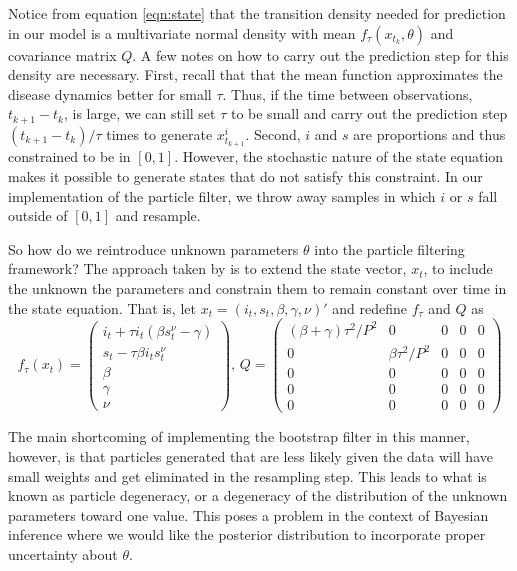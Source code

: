 \documentclass{article}
\begin{document}
Notice from equation \eqref{eqn:state} that the transition density needed for prediction in our model is a multivariate normal density with mean $f_\tau(x_{t_k},\theta)$ and covariance matrix $Q$.  A few notes on how to carry out the prediction step for this density are necessary. First, recall that that the mean function approximates the disease dynamics better for small $\tau$.  Thus, if the time between observations, $t_{k+1} - t_k$, is large, we can still set $\tau$ to be small and carry out the prediction step $(t_{k+1} - t_k) / \tau$ times to generate $x_{t_{k+1}}^i$.  Second, $i$ and $s$ are proportions and thus constrained to be in $[0,1]$.  However, the stochastic nature of the state equation makes it possible to generate states that do not satisfy this constraint.  In our implementation of the particle filter, we throw away samples in which $i$ or $s$ fall outside of $[0,1]$ and resample.

So how do we reintroduce unknown parameters $\theta$ into the particle filtering framework?  The approach taken by \citet{skvortsov} is to extend the state vector, $x_t$, to include the unknown the parameters and constrain them to remain constant over time in the state equation.  That is, let $x_t = (i_t,s_t,\beta,\gamma,\nu)'$ and redefine $f_\tau$ and $Q$ as
\[
f_\tau(x_t) = \left(
\begin{array}{c}
i_t + \tau i_t(\beta s^{\nu}_t - \gamma) \\
s_t - \tau\beta i_ts^{\nu}_t \\
\beta \\
\gamma \\
\nu
\end{array}
\right)
\mbox{, }
Q = \left(
\begin{array}{ccccc}
(\beta + \gamma)\tau^2/P^2 & 0 & 0 & 0 & 0 \\
0 & \beta\tau^2/P^2 & 0 & 0 & 0 \\
0 & 0 & 0 & 0 & 0 \\
0 & 0 & 0 & 0 & 0 \\
0 & 0 & 0 & 0 & 0
\end{array}
\right)
 \]

\noindent The main shortcoming of implementing the bootstrap filter in this manner, however, is that particles generated that are less likely given the data will have small weights and get eliminated in the resampling step.  This leads to what is known as particle degeneracy, or a degeneracy of the distribution of the unknown parameters toward one value.  This poses a problem in the context of Bayesian inference where we would like the posterior distribution to incorporate proper uncertainty about $\theta$.
\end{document}
